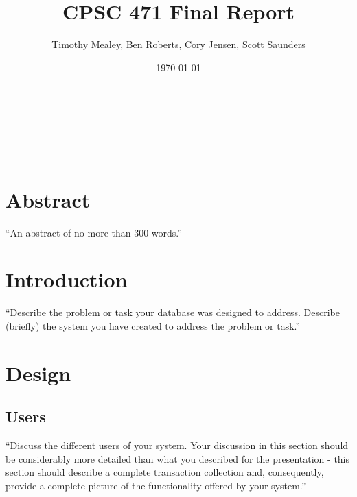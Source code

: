 \documentclass[twoside=false,a4paper,11pt]{article}
\makeatletter
\newcommand{\linia}{\rule{\linewidth}{0.5pt}}
\theoremstyle{mytheor}
\renewcommand{\maketitle}{
\begin{center}
\vspace{2ex}
{\huge \textsc{\@title}}
\vspace{1ex}
\\
\linia\\
\@author \hfill \@date
\vspace{4ex}
\end{center}
}
\makeatother
\begin{document}
\title{CPSC 471 Final Report}
\author{Timothy Mealey, Ben Roberts, Cory Jensen, Scott Saunders}
\date{\today}
\maketitle

\section*{Abstract}

``An abstract of no more than 300 words.''

\section*{Introduction}

``Describe the problem or task your database was designed to address.
Describe (briefly) the system you have created to address the problem or task.''

\section*{Design}

\subsection*{Users}

``Discuss the different users of your system. Your discussion in this section should be considerably more detailed than what you described for the presentation - this section should describe a complete transaction collection and, consequently, provide a complete picture of the functionality offered by your system.''
\end{document}
